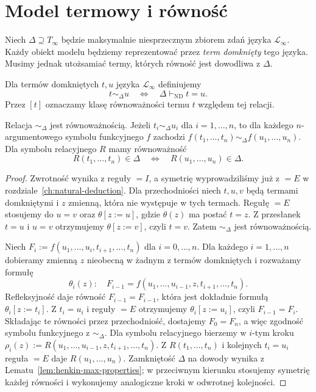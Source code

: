 \section{Model termowy i równość}\label{sec:henkin-term-model}
Niech $\Delta\supseteq T_{\infty}$ będzie maksymalnie niesprzecznym zbiorem zdań języka $\mathcal L_{\infty}$. Każdy obiekt modelu będziemy reprezentować przez \emph{term domknięty} tego języka. Musimy jednak utożsamiać termy, których równość jest dowodliwa z $\Delta$.

\begin{definicja}\label{def:henkin-term-equivalence}
Dla termów domkniętych $t,u$ języka $\mathcal L_{\infty}$ definiujemy
\[
t\sim_{\Delta}u\quad\Longleftrightarrow\quad\Delta\vdash_{\mathrm{ND}}t=u.
\]
Przez $[t]$ oznaczamy klasę równoważności termu $t$ względem tej relacji.
\end{definicja}

\begin{lemat}\label{lem:henkin-congruence}
Relacja $\sim_{\Delta}$ jest równoważnością. Jeżeli $t_i\sim_{\Delta}u_i$ dla $i=1,\ldots,n$, to dla każdego $n$-argumentowego symbolu funkcyjnego $f$ zachodzi
$f(t_1,\ldots,t_n)\sim_{\Delta}f(u_1,\ldots,u_n)$.
Dla symbolu relacyjnego $R$ mamy równoważność
\[
R(t_1,\ldots,t_n)\in\Delta
\quad\Longleftrightarrow\quad
R(u_1,\ldots,u_n)\in\Delta.
\]
\end{lemat}
\begin{proof}
Zwrotność wynika z reguły $=I$, a symetrię wyprowadziliśmy już z $=E$ w rozdziale~\ref{ch:natural-deduction}. Dla przechodniości niech $t,u,v$ będą termami domkniętymi i $z$ zmienną, która nie występuje w tych termach. Regułę $=E$ stosujemy do $u=v$ oraz $\theta[z:=u]$, gdzie $\theta(z)$ ma postać $t=z$. Z przesłanek $t=u$ i $u=v$ otrzymujemy $\theta[z:=v]$, czyli $t=v$. Zatem $\sim_{\Delta}$ jest równoważnością.

Niech $F_i:=f(u_1,\ldots,u_i,t_{i+1},\ldots,t_n)$ dla $i=0,\ldots,n$. Dla każdego $i=1,\ldots,n$ dobieramy zmienną $z$ nieobecną w żadnym z termów domkniętych i rozważamy formułę
\[
\theta_i(z):\quad F_{i-1}=f(u_1,\ldots,u_{i-1},z,t_{i+1},\ldots,t_n).
\]
Refleksyjność daje równość $F_{i-1}=F_{i-1}$, która jest dokładnie formułą $\theta_i[z:=t_i]$. Z $t_i=u_i$ i reguły $=E$ otrzymujemy $\theta_i[z:=u_i]$, czyli $F_{i-1}=F_i$. Składając te równości przez przechodniość, dostajemy $F_0=F_n$, a więc zgodność symbolu funkcyjnego z $\sim_{\Delta}$. Dla symbolu relacyjnego bierzemy w $i$-tym kroku $\rho_i(z):=R(u_1,\ldots,u_{i-1},z,t_{i+1},\ldots,t_n)$. Z $R(t_1,\ldots,t_n)$ i kolejnych $t_i=u_i$ reguła $=E$ daje $R(u_1,\ldots,u_n)$. Zamkniętość $\Delta$ na dowody wynika z Lematu~\ref{lem:henkin-max-properties}; w przeciwnym kierunku stosujemy symetrię każdej równości i wykonujemy analogiczne kroki w odwrotnej kolejności.
\end{proof}


